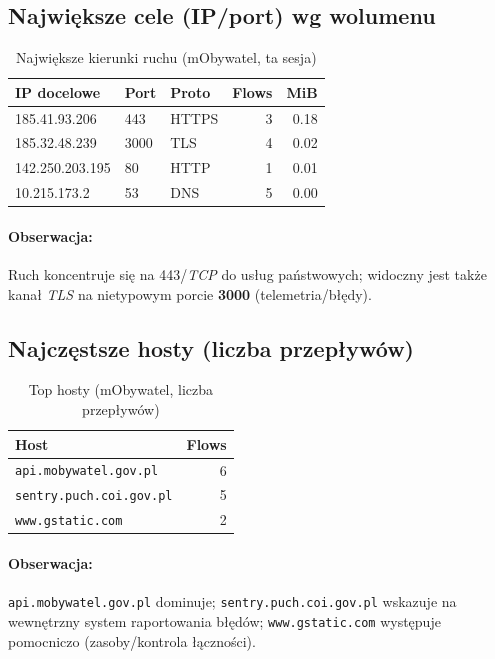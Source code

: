\subsection{Największe cele (IP/port) wg wolumenu}
\begin{table}[H]
  \centering
  \caption{Największe kierunki ruchu (mObywatel, ta sesja)}
  \label{tab:mobywatel-topdst}
  \begin{tabular}{lllrr}
    \toprule
    \textbf{IP docelowe} & \textbf{Port} & \textbf{Proto} & \textbf{Flows} & \textbf{MiB} \\
    \midrule
    185.41.93.206  & 443  & HTTPS & 3 & 0.18 \\
    185.32.48.239  & 3000 & TLS   & 4 & 0.02 \\
    142.250.203.195 & 80  & HTTP  & 1 & 0.01 \\
    10.215.173.2   & 53   & DNS   & 5 & 0.00 \\
    \bottomrule
  \end{tabular}
\end{table}

\paragraph{Obserwacja:}
Ruch koncentruje się na 443/\emph{TCP} do usług państwowych; widoczny jest także kanał \emph{TLS} na nietypowym porcie \textbf{3000} (telemetria/błędy).

\subsection{Najczęstsze hosty (liczba przepływów)}
\begin{table}[H]
  \centering
  \caption{Top hosty (mObywatel, liczba przepływów)}
  \label{tab:mobywatel-hosts}
  \begin{tabular}{lr}
    \toprule
    \textbf{Host} & \textbf{Flows} \\
    \midrule
    \texttt{api.mobywatel.gov.pl} & 6 \\
    \texttt{sentry.puch.coi.gov.pl} & 5 \\
    \texttt{www.gstatic.com} & 2 \\
    \bottomrule
  \end{tabular}
\end{table}

\paragraph{Obserwacja:}
\texttt{api.mobywatel.gov.pl} dominuje; \texttt{sentry.puch.coi.gov.pl} wskazuje na wewnętrzny system raportowania błędów; \texttt{www.gstatic.com} występuje pomocniczo (zasoby/kontrola łączności).


